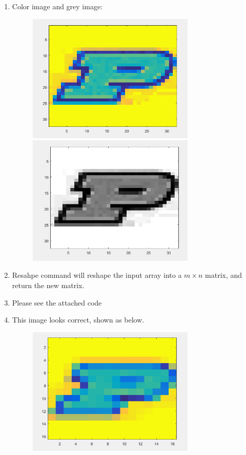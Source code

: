 \documentclass{article}
\begin{document}
\begin{enumerate}
\item  Color image and grey image: 
\begin{figure} [h]
\includegraphics[width=8cm]{color}
\includegraphics[width=8cm]{gray}
\end{figure}

\item Resahpe command will reshape the input array into a $m\times n$ matrix, and return the new matrix. 


\item Please see the attached code 

\item  This image looks correct, shown as below.  
\begin{figure} [h]
\includegraphics[width=8cm]{reduced}


\end{figure}
\end{enumerate}
\end{document}
